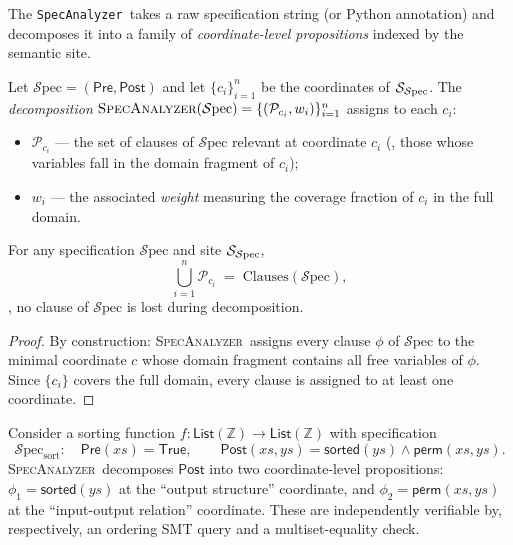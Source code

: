 \documentclass[11pt]{article}
\newcommand{\Spec}{\mathcal{S}\mathrm{pec}}        %
\newcommand{\Pre}{\ensuremath{\mathsf{Pre}}}                     %
\newcommand{\Post}{\ensuremath{\mathsf{Post}}}                   %
\newcommand{\SpecAn}{\textsc{SpecAnalyzer}}         %
\newcommand{\Props}{\mathcal{P}}                    %
\newcommand{\CoordProps}[1]{\Props_{#1}}            %
\newcommand{\SatSite}{{\Site_{\Spec}}}                %
\newcommand{\SpecAnalyzer}{\texttt{SpecAnalyzer}}
\begin{document}
The \SpecAnalyzer\ takes a raw specification string (or Python
annotation) and decomposes it into a family of \emph{coordinate-level
propositions} indexed by the semantic site.

\begin{definition}[Decomposition]\label{def:decomp}
Let $\Spec = (\Pre, \Post)$ and let $\{c_i\}_{i=1}^n$ be the
coordinates of $\SatSite$.  The \emph{decomposition}
$\SpecAn(\Spec) = \{(\CoordProps{c_i}, w_i)\}_{i=1}^n$
assigns to each $c_i$:
\begin{itemize}[leftmargin=2em]
  \item $\CoordProps{c_i}$ — the set of clauses of $\Spec$ relevant
        at coordinate $c_i$ (\ie, those whose variables fall in
        the domain fragment of $c_i$);
  \item $w_i$ — the associated \emph{weight} measuring the coverage
        fraction of $c_i$ in the full domain.
\end{itemize}
\end{definition}

\begin{proposition}\label{prop:decomp-faithful}
For any specification $\Spec$ and site $\SatSite$,
\[
  \bigcup_{i=1}^n \CoordProps{c_i} \;=\; \mathrm{Clauses}(\Spec),
\]
\ie, no clause of $\Spec$ is lost during decomposition.
\end{proposition}
\begin{proof}
By construction: \SpecAn\ assigns every clause $\phi$ of $\Spec$ to
the minimal coordinate $c$ whose domain fragment contains all free
variables of $\phi$.  Since $\{c_i\}$ covers the full domain, every
clause is assigned to at least one coordinate.
\end{proof}

\begin{example}\label{ex:sort-spec}
Consider a sorting function $f : \mathsf{List}(\mathbb{Z}) \to
\mathsf{List}(\mathbb{Z})$ with specification
\[
  \Spec_{\mathrm{sort}}:\quad
  \Pre(xs) = \mathsf{True},\qquad
  \Post(xs, ys) = \mathsf{sorted}(ys) \land \mathsf{perm}(xs, ys).
\]
\SpecAn\ decomposes $\Post$ into two coordinate-level propositions:
$\phi_1 = \mathsf{sorted}(ys)$ at the ``output structure'' coordinate,
and $\phi_2 = \mathsf{perm}(xs, ys)$ at the ``input-output relation''
coordinate.  These are independently verifiable by, respectively, an
ordering SMT query and a multiset-equality check.
\end{example}
\end{document}
